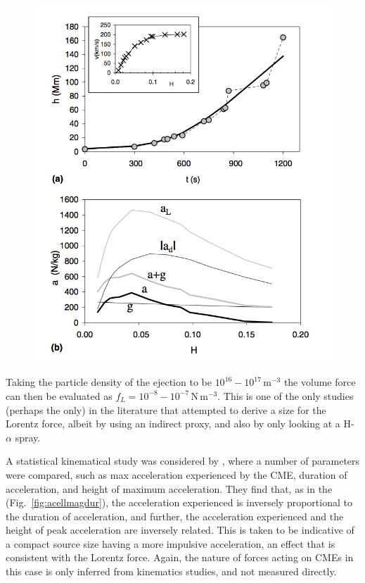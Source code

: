 \begin{figure}[ts!]
\begin{center}
\includegraphics[scale=0.5]{images/vrsnak_lorentz}
\caption{ \citep{vrs06}}
\end{center}
\label{fig:vrsnak06}
\end{figure}
Taking the particle density of the ejection to be $10^{16}-10^{17}$\,m$^{-3}$ the volume force can then be evaluated as $f_L = 10^{-8}-10^{-7}$\,N\,m$^{-3}$. This is one of the only studies (perhaps the only) in the literature that attempted to derive a size for the Lorentz force, albeit by using an indirect proxy, and also by only looking at a H-$\alpha$ spray.


A statistical kinematical study was considered by \citep{bein2011}, where a number of parameters were compared, such as max acceleration experienced by the CME, duration of acceleration, and height of maximum acceleration. They find that, as in the \citet{zhang2006} (Fig.~\ref{fig:acellmagdur}), the acceleration experienced is inversely proportional to the duration of acceleration, and further, the acceleration experienced and the height of peak acceleration are inversely related. This is taken to be indicative of a compact source size having a more impulsive acceleration, an effect that is consistent with the Lorentz force. Again, the nature of forces acting on CMEs in this case is only inferred from kinematics studies, and not measured directly.

